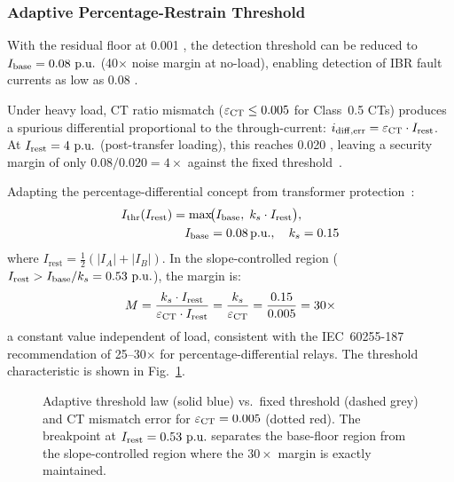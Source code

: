 \documentclass[journal,twoside,10pt]{IEEEtran}
\newcommand{\Irest}{I_{\mathrm{rest}}}
\newcommand{\Ithr}{I_{\mathrm{thr}}}
\newcommand{\pu}{\,\text{p.u.}}
\begin{document}
\subsubsection{Adaptive Percentage-Restrain Threshold}
\label{sec:thresh}

With the residual floor at 0.001\,\pu, the detection threshold can be reduced
to $I_{\rm base} = 0.08\,\pu$ (40$\times$ noise margin at no-load), enabling
detection of IBR fault currents as low as 0.08\,\pu.

Under heavy load, CT ratio mismatch ($\varepsilon_{\rm CT} \leq 0.005$
for Class~0.5 CTs) produces a spurious differential proportional to the
through-current: $i_{\rm diff,err} = \varepsilon_{\rm CT} \cdot I_{\rm rest}$.
At $I_{\rm rest} = 4\,\pu$ (post-transfer loading), this reaches 0.020\,\pu,
leaving a security margin of only $0.08/0.020 = 4\times$ against the fixed
threshold~\cite{SAMBP_TR17}.

Adapting the percentage-differential concept from transformer
protection~\cite{Blackburn2006,Anderson1999}:
\begin{equation}
  \begin{split}
  \Ithr(\Irest) &= \max\!\bigl(I_{\rm base},\; k_s \cdot \Irest\bigr), \\
  &\quad I_{\rm base} = 0.08\pu,\quad k_s = 0.15
  \end{split}
  \label{eq:thresh}
\end{equation}
where $\Irest = \tfrac{1}{2}(|I_A| + |I_B|)$.  In the slope-controlled
region ($\Irest > I_{\rm base}/k_s = 0.53\,\pu$), the margin is:
\begin{equation}
  M = \frac{k_s \cdot \Irest}{\varepsilon_{\rm CT} \cdot \Irest}
    = \frac{k_s}{\varepsilon_{\rm CT}}
    = \frac{0.15}{0.005} = 30\times
  \label{eq:margin}
\end{equation}
a constant value independent of load, consistent with the IEC~60255-187
recommendation of 25--30$\times$ for percentage-differential relays.
The threshold characteristic is shown in Fig.~\ref{fig:threshold}.

\begin{figure}[!t]
  \centering
  
  \caption{Adaptive threshold law (solid blue) vs.\ fixed threshold (dashed
           grey) and CT mismatch error for $\varepsilon_{\rm CT} = 0.005$ (dotted red).
           The breakpoint at $I_{\rm rest} = 0.53\,\pu$ separates the
           base-floor region from the slope-controlled region where
           the $30\times$ margin is exactly maintained.}
  \label{fig:threshold}
\end{figure}
\end{document}
